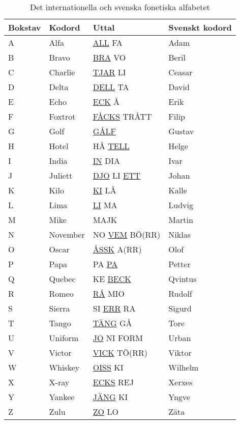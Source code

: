 \begin{table}[htbp]
  \label{tab:bokstavering-internationell}
  \label{tab:bokstavering-svenska}
  \caption{Det internationella och svenska fonetiska alfabetet}
  \begin{tabular}{llll}
    Bokstav & Kodord & Uttal & Svenskt kodord \\ \hline
    A & Alfa  & \underline{ALL} FA & Adam \\
    B & Bravo & \underline{BRA} VO & Beril \\
    C & Charlie & \underline{TJAR} LI & Ceasar \\
    D & Delta & \underline{DELL} TA & David \\
    E & Echo & \underline{ECK} Å & Erik \\
    F & Foxtrot & \underline{FÅCKS} TRÅTT & Filip\\
    G & Golf & \underline{GÅLF} & Gustav \\
    H & Hotel & HÅ \underline{TELL} & Helge \\
    I & India & \underline{IN} DIA & Ivar \\
    J & Juliett & \underline{DJO} LI \underline{ETT} & Johan \\
    K & Kilo & \underline{KI} LÅ & Kalle \\
    L & Lima & \underline{LI} MA & Ludvig \\
    M & Mike & MAJK & Martin \\
    N & November & NO \underline{VEM} BÖ(RR) & Niklas \\
    O & Oscar & \underline{ÅSSK} A(RR) & Olof \\
    P & Papa & PA \underline{PA} & Petter \\
    Q & Quebec & KE \underline{BECK} & Qvintus \\
    R & Romeo & \underline{RÅ} MIO & Rudolf \\
    S & Sierra & SI \underline{ERR} RA & Sigurd \\
    T & Tango & \underline{TÄNG} GÅ & Tore \\
    U & Uniform & \underline{JO} NI FORM & Urban \\
    V & Victor & \underline{VICK} TÖ(RR) & Viktor \\
    W & Whiskey & \underline{OISS} KI & Wilhelm \\
    X & X-ray & \underline{ECKS} REJ & Xerxes \\
    Y & Yankee & \underline{JÄNG} KI & Yngve \\
    Z & Zulu & \underline{ZO} LO & Zäta \\

\end{tabular}
\end{table}
